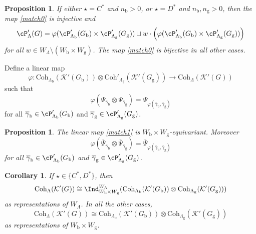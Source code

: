 \documentclass[12pt,a4paper]{amsart}
\newcommand{\CK}{{\mathcal {K}}}
\newcommand{\be}{\begin {equation}}
\newcommand{\ee}{\end {equation}}
\numberwithin{equation}{section}
\newtheorem{prop}[thm]{Proposition}
\newtheorem{cor}[thm]{Corollary}
\theoremstyle{remark}
\def\Coh{\mathrm{Coh}}
\begin{document}
 \begin{prop}\label{para}
 If either $\star=C^*$ and $n_\mathrm b>0$, or $\star=D^*$ and $n_\mathrm b, n_\mathrm g>0$, then the map \eqref{match0} is injective and
 \[
   \cP'_{\Lambda}(G)=\varphi(\cP'_{\Lambda_\mathrm b}(G_\mathrm b)\times \cP'_{\Lambda_\mathrm g}(G_\mathrm g))\sqcup w\cdot\left(\varphi(\cP'_{\Lambda_\mathrm b}(G_\mathrm b)\times \cP'_{\Lambda_\mathrm g}(G_\mathrm g))\right)
 \]
 for all $w\in W_\Lambda\setminus (W_\mathrm b\times W_\mathrm g)$. The map \eqref{match0} is bijective in all other cases.
 \end{prop}

Define a linear map
\be\label{match1}
  \varphi: \Coh_{\Lambda_\mathrm b}(\CK'(G_\mathrm b))\otimes \Coh'_{\Lambda_\mathrm g}(\CK'(G_\mathrm g))\rightarrow \Coh_{\Lambda}(\CK'(G))
\ee
such that
\[
 \varphi(\Psi_{\bar \gamma_\mathrm b}\otimes \Psi_{\bar \gamma_\mathrm g})=\Psi_{\varphi(\bar \gamma_\mathrm b, \bar \gamma_\mathrm g)}
\]
for all $\overline\gamma_\mathrm b \in\cP'_{\Lambda_\mathrm b}(G_\mathrm b)$ and $\overline\gamma_\mathrm g \in\cP'_{\Lambda_\mathrm g}(G_\mathrm g)$.


\begin{prop}\label{matchth}
The linear map \eqref{match1} is $W_\mathrm b\times W_\mathrm g$-equivariant. Moreover
\[
 \varphi(\overline \Psi_{\bar \gamma_\mathrm b}\otimes \overline \Psi_{\bar \gamma_\mathrm g})=\overline \Psi_{\varphi(\bar \gamma_\mathrm b, \bar \gamma_\mathrm g)}
\]
for all $\overline\gamma_\mathrm b \in\cP'_{\Lambda_\mathrm b}(G_\mathrm b)$ and $\overline\gamma_\mathrm g \in\cP'_{\Lambda_\mathrm g}(G_\mathrm g)$.

\end{prop}




\begin{cor}
 If $\star\in \{C^*, D^*\}$, then
\[
 \Coh_{\Lambda}(\CK'(G))\cong \Ind^{W_\Lambda}_{W_\mathrm b\times W_\mathrm g} (\Coh_{\Lambda_\mathrm b}(\CK'(G_\mathrm b))\otimes \Coh_{\Lambda_\mathrm g}(\CK'(G_\mathrm g)))
 \]
 as representations of $W_\Lambda$. In all the other cases,
\[
 \Coh_{\Lambda}(\CK'(G))\cong \Coh_{\Lambda_\mathrm b}(\CK'(G_\mathrm b))\otimes \Coh_{\Lambda_\mathrm g}(\CK'(G_\mathrm g))
 \]
 as representations of $W_\mathrm b\times W_\mathrm g$.

\end{cor}



\end{document}
